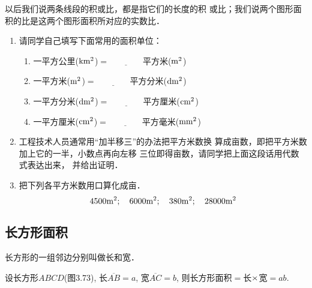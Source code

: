 以后我们说两条线段的积或比，都是指它们的长度的积
或比；我们说两个图形面积的比是这两个图形面积所对应的实数比．

\begin{ex}
\begin{enumerate}
    \item 请同学自己填写下面常用的面积单位：
\begin{enumerate}
\item     一平方公里($\rm km^2$)$=\underline{\qquad\qquad}$平方米($\rm m^2$)
\item     一平方米($\rm m^2$)$=\underline{\qquad\qquad}$平方分米($\rm dm^2$)
\item    一平方分米($\rm dm^2$)$=\underline{\qquad\qquad}$平方厘米($\rm cm^2$)
\item 一平方厘米($\rm cm^2$)$=\underline{\qquad\qquad}$平方毫米($\rm mm^2$)
\end{enumerate}

    \item 工程技术人员通常用“加半移三”的办法把平方米数换
    算成亩数，即把平方米数加上它的一半，小数点再向左移
    三位即得亩数，请同学把上面这段话用代数式表达出来，
    并给出证明．
    \item 把下列各平方米数用口算化成亩．
\[ 4500{\rm m^2};\quad     6000{\rm m^2};\quad     380{\rm m^2};
 \quad    28000{\rm m^2}\]
\end{enumerate}
\end{ex}

\subsection{长方形面积}
长方形的一组邻边分别叫做长和宽．

设长方形$ABCD$(图3.73), 长$\overline{AB}=a$, 宽$\overline{AC}=b$, 
则长方形面积$=$长$\times$宽$=ab$.

\begin{figure}[htp]
    \centering
{}
    \caption{}
\end{figure}


